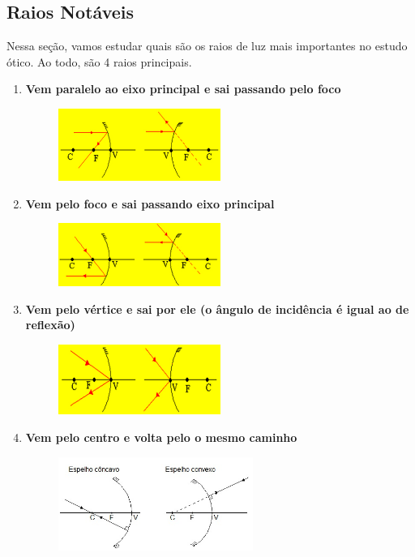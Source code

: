 \documentclass[12pt]{extarticle}
\newcommand{\<}{\langle}
\renewcommand{\>}{\rangle}
\theoremstyle{definition}
\begin{document}
\subsection{Raios Notáveis}
Nessa seção, vamos estudar quais são os raios de luz mais importantes no estudo ótico. Ao todo, são 4 raios principais.
\begin{enumerate}
    \item \textbf{Vem paralelo ao eixo principal e sai passando pelo foco}
    \begin{figure}[H]
        \centering
        \includegraphics[width=0.5\textwidth]{raio_principal_1.jpg}
        \label{fig:raio_principal_1}
    \end{figure}
    
    \item \textbf{Vem pelo foco e sai passando eixo principal}
    \begin{figure}[H]
        \centering
        \includegraphics[width=0.5\textwidth]{raio_principal_2.jpg}
        \label{fig:raio_principal_2}
    \end{figure}
    
    \item \textbf{Vem pelo vértice e sai por ele (o ângulo de incidência é igual ao de reflexão)}
    \begin{figure}[H]
        \centering
        \includegraphics[width=0.5\textwidth]{raio_principal_3.jpg}
        \label{fig:raio_principal_3}
    \end{figure}
    
    \item \textbf{Vem pelo centro e volta pelo o mesmo caminho}
    \begin{figure}[H]
        \centering
        \includegraphics[width=0.6\textwidth]{raio_principal_4.jpg}
        \label{fig:raio_principal_4}
    \end{figure}
\end{enumerate}
\end{document}
